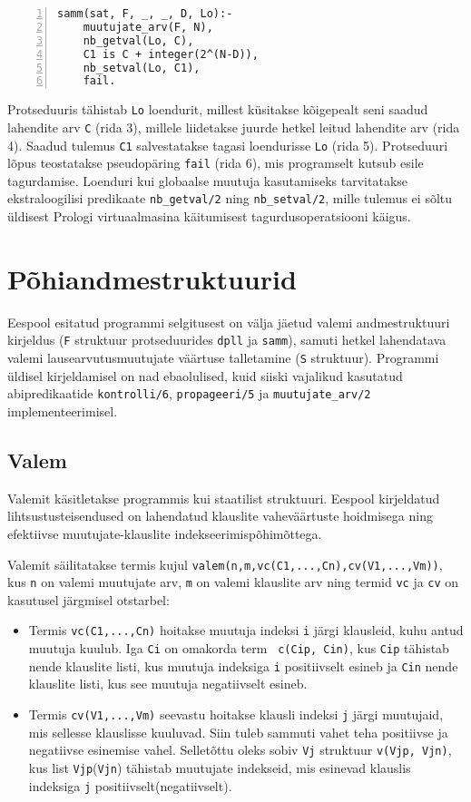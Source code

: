 \begin{lstlisting}[numbers=left,xleftmargin=1cm,basicstyle=\tt]
samm(sat, F, _, _, D, Lo):-
	muutujate_arv(F, N),
	nb_getval(Lo, C),
	C1 is C + integer(2^(N-D)),
	nb_setval(Lo, C1),
	fail.
\end{lstlisting}

Protseduuris tähistab \texttt{Lo} loendurit, millest küsitakse kõigepealt seni
saadud lahendite arv \texttt{C} (rida 3), millele liidetakse juurde hetkel
leitud lahendite arv (rida 4). Saadud tulemus \texttt{C1} salvestatakse tagasi
loendurisse \texttt{Lo} (rida 5). Protseduuri lõpus teostatakse
pseudopäring \texttt{fail} (rida 6), mis programselt kutsub esile tagurdamise.
Loenduri kui globaalse muutuja kasutamiseks tarvitatakse ekstraloogilisi predikaate
\texttt{nb\_getval/2} ning \texttt{nb\_setval/2}, mille tulemus ei sõltu
üldisest Prologi virtuaalmasina käitumisest tagurdusoperatsiooni käigus.

\section{Põhiandmestruktuurid}

Eespool esitatud programmi selgitusest on välja jäetud valemi andmestruktuuri
kirjeldus (\texttt{F} struktuur protseduurides \texttt{dpll} ja \texttt{samm}),
samuti hetkel lahendatava valemi lausearvutusmuutujate väärtuse talletamine
(\texttt{S} struktuur). Programmi üldisel kirjeldamisel on nad ebaolulised,
kuid siiski vajalikud kasutatud abipredikaatide \texttt{kontrolli/6},
\texttt{propageeri/5} ja \texttt{muutujate\_arv/2} implementeerimisel.

\subsection{Valem}

Valemit käsitletakse programmis kui staatilist struktuuri. Eespool kirjeldatud
lihtsustusteisendused on lahendatud klauslite vaheväärtuste hoidmisega ning
efektiivse muutujate-klauslite indekseerimispõhimõttega.

Valemit säilitatakse termis kujul
{\tt valem(n,m,vc(C1,...,Cn),cv(V1,...,Vm))}, kus {\tt n} on valemi muutujate
arv, {\tt m} on valemi klauslite arv ning termid {\tt vc} ja {\tt cv} on kasutusel järgmisel
otstarbel:

\begin{itemize}
	\item Termis {\tt vc(C1,...,Cn)} hoitakse muutuja indeksi {\tt i} järgi
	klausleid, kuhu antud muutuja kuulub. Iga {\tt Ci} on omakorda term {\tt
	c(Cip, Cin)}, kus {\tt Cip} tähistab nende klauslite listi, kus muutuja
	indeksiga {\tt i} positiivselt esineb ja {\tt Cin} nende klauslite listi, kus
	see muutuja negatiivselt esineb.
	\item Termis {\tt cv(V1,...,Vm)} seevastu hoitakse klausli indeksi {\tt j}
	järgi muutujaid, mis sellesse klauslisse kuuluvad. Siin tuleb sammuti vahet
	teha positiivse ja negatiivse esinemise vahel. Selletõttu oleks sobiv {\tt Vj}
	struktuur {\tt v(Vjp, Vjn)}, kus list {\tt Vjp}({\tt Vjn}) tähistab muutujate
	indekseid, mis esinevad klauslis indeksiga {\tt j} positiivselt(negatiivselt).
\end{itemize}

